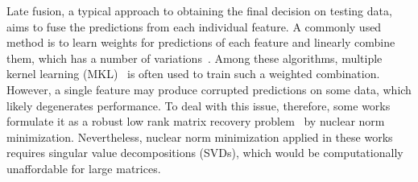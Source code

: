 \documentclass[letterpaper]{article}
\def\yanred{\textcolor{red}}
\begin{document}
Late fusion, a typical approach to obtaining the final decision on testing data, aims to fuse the predictions from each individual feature.
A commonly used method is to learn weights for predictions of each feature and linearly combine them, which has a number of variations~\cite{gehler2009feature,xuiccv2013feature,lai2015learning}.
Among these algorithms, multiple kernel learning (MKL)~\cite{lanckriet2004learning,Rakotomamonjy2008Simplemkl} is often used to train such a weighted combination.
However, a single feature may produce corrupted predictions on some data, which likely degenerates performance.
To deal with this issue, therefore, some works formulate it as a robust low rank matrix recovery problem~\cite{gaoijcai2016robust,ye2012robust} by nuclear norm minimization.
Nevertheless, nuclear norm minimization applied in these works requires singular value decompositions (SVDs), which would be computationally unaffordable for large matrices.



\end{document}
